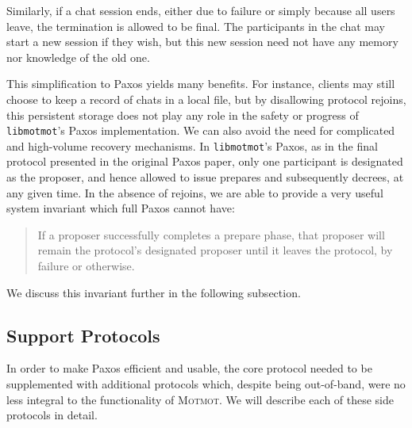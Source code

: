 \documentclass{sig-alternate}
\newcommand\Motmot{\textsc{Motmot}\xspace}
\newcommand\libmotmot{\texttt{libmotmot}\xspace}
\begin{document}
Similarly, if a chat session ends, either due to failure or simply because all
users leave, the termination is allowed to be final.  The participants in the
chat may start a new session if they wish, but this new session need not have
any memory nor knowledge of the old one.

This simplification to Paxos yields many benefits.  For instance, clients may
still choose to keep a record of chats in a local file, but by disallowing
protocol rejoins, this persistent storage does not play any role in the safety
or progress of \libmotmot's Paxos implementation.  We can also avoid the need
for complicated and high-volume recovery mechanisms.  In \libmotmot's Paxos,
as in the final protocol presented in the original Paxos paper, only one
participant is designated as the proposer, and hence allowed to issue prepares
and subsequently decrees, at any given time.  In the absence of rejoins, we
are able to provide a very useful system invariant which full Paxos cannot
have:
\begin{quote}
  If a proposer successfully completes a prepare phase, that proposer will
  remain the protocol's designated proposer until it leaves the protocol, by
  failure or otherwise.
\end{quote}
We discuss this invariant further in the following subsection.

\subsection{Support Protocols}

In order to make Paxos efficient and usable, the core protocol needed to be
supplemented with additional protocols which, despite being out-of-band, were
no less integral to the functionality of \Motmot.  We will describe each of
these side protocols in detail.
\end{document}
